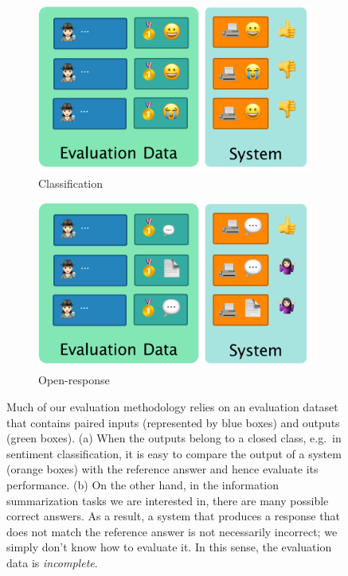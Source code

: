 \begin{figure}
  \hfill
  \begin{subfigure}{0.45\textwidth}
  \includegraphics[width=\textwidth]{figures/classification}
  \caption{Classification}
  \end{subfigure} 
  \hfill
  \begin{subfigure}{0.45\textwidth}
  \includegraphics[width=\textwidth]{figures/generation}
  \caption{Open-response}
  \end{subfigure}
  \hfill

  \caption[Complete and incomplete evaluation sets]{\label{fig:intro:evaluation-data} 
  Much of our evaluation methodology relies on an evaluation dataset that contains paired inputs (represented by blue boxes) and outputs (green boxes).
  (a) When the outputs belong to a closed class, e.g.\ in sentiment classification, it is easy to compare the output of a system (orange boxes) with the reference answer and hence evaluate its performance.
  (b) On the other hand, in the information summarization tasks we are interested in, there are many possible correct answers. As a result, a system that produces a response that does not match the reference answer is not necessarily incorrect; we simply don't know how to evaluate it. In this sense, the evaluation data is \textit{incomplete}.
  }
\end{figure}
